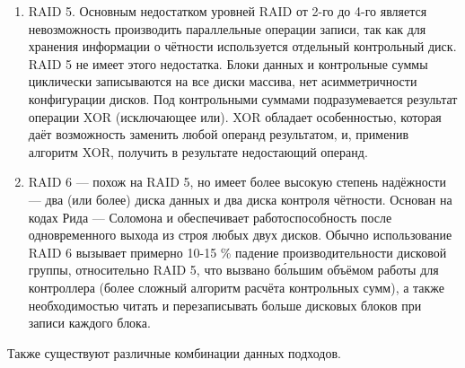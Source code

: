 \begin{enumerate}
\begin{enumerate}
         \item RAID 5. Основным недостатком уровней RAID от 2-го до 4-го является невозможность производить параллельные операции записи, так как для хранения информации о чётности используется отдельный контрольный диск. RAID 5 не имеет этого недостатка. Блоки данных и контрольные суммы циклически записываются на все диски массива, нет асимметричности конфигурации дисков. Под контрольными суммами подразумевается результат операции XOR (исключающее или). XOR обладает особенностью, которая даёт возможность заменить любой операнд результатом, и, применив алгоритм XOR, получить в результате недостающий операнд.
         \item RAID 6 — похож на RAID 5, но имеет более высокую степень надёжности — два (или более) диска данных и два диска контроля чётности. Основан на кодах Рида — Соломона и обеспечивает работоспособность после одновременного выхода из строя любых двух дисков. Обычно использование RAID 6 вызывает примерно 10-15 \% падение производительности дисковой группы, относительно RAID 5, что вызвано б\'{о}льшим объёмом работы для контроллера (более сложный алгоритм расчёта контрольных сумм), а также необходимостью читать и перезаписывать больше дисковых блоков при записи каждого блока.
     \end{enumerate}
     Также существуют различные комбинации данных подходов.
\end{enumerate}

